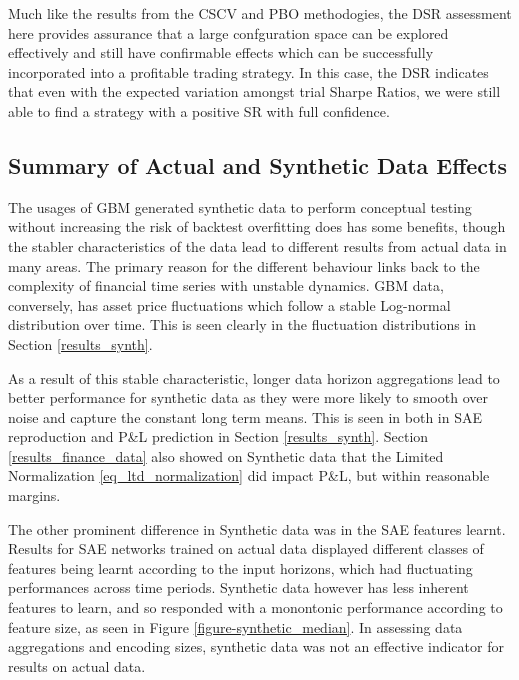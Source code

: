 \documentclass[a4paper,11pt,oneside]{article}
\theoremstyle{plain}
\theoremstyle{definition}
\begin{document}
	Much like the results from the CSCV and PBO methodogies, the DSR assessment here provides assurance that a large confguration space can be explored effectively and still have confirmable effects which can be successfully incorporated into a profitable trading strategy. In this case, the DSR indicates that even with the expected variation amongst trial Sharpe Ratios, we were still able to find a strategy with a positive SR with full confidence.

	
	\newpage
	\subsection{Summary of Actual and Synthetic Data Effects}\label{results_synth_summary}
	
		The usages of GBM generated synthetic data to perform conceptual testing without increasing the risk of backtest overfitting does has some benefits, though the stabler characteristics of the data lead to different results from actual data in many areas. The primary reason for the different behaviour links back to the complexity of financial time series with unstable dynamics. GBM data, conversely, has asset price fluctuations which follow a stable Log-normal distribution over time. This is seen clearly in the fluctuation distributions in Section \ref{results_synth}. \newline
		
		As a result of this stable characteristic, longer data horizon aggregations lead to better performance for synthetic data as they were more likely to smooth over noise and capture the constant long term means. This is seen in both in SAE reproduction and P\&L prediction in Section \ref{results_synth}. Section \ref{results_finance_data} also showed on Synthetic data that the Limited Normalization \eqref{eq_ltd_normalization} did impact P\&L, but within reasonable margins.\newline
	
		The other prominent difference in Synthetic data was in the SAE features learnt. Results for SAE networks trained on actual data displayed different classes of features being learnt according to the input horizons, which had fluctuating performances across time periods. Synthetic data however has less inherent features to learn, and so responded with a monontonic performance according to feature size, as seen in Figure \ref{figure-synthetic_median}. In assessing data aggregations and encoding sizes, synthetic data was not an effective indicator for results on actual data. \newline
	
\end{document}
